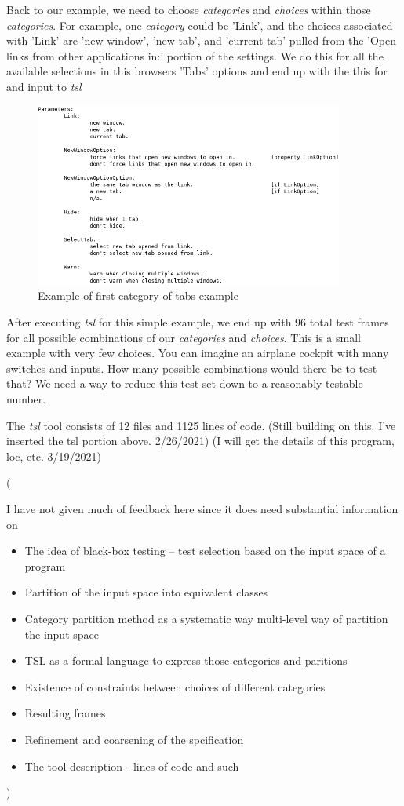 \documentclass[a4full,12pt]{article}
\newcommand{\eas}[1]{{\color{blue}\sf ({#1})}}
\newcommand{\ag}[1]{{\color{red}\sf ({#1})}}
\begin{document}
Back to our example, we need to choose \emph{categories} and \emph{choices} within those
  \emph{categories}. For example, one \emph{category} could be 'Link', and the choices
  associated with 'Link' are 'new window', 'new tab', and 'current tab' pulled from the
  'Open links from other applications in:' portion of the settings. We do this for all
  the available selections in this browsers 'Tabs' options and end up with the this for
  and input to \emph{tsl}
\begin{figure}[htb]
\centering
\includegraphics[width=4in,keepaspectratio]{images/tsl_input_final.png}
\caption{Example of first category of tabs example}
\label{fig:tsl_input_final}
\end{figure}

After executing \emph{tsl} for this simple example, we end up with 96 total test frames
  for all possible combinations of our \emph{categories} and \emph{choices}. This is a
  small example with very few choices. You can imagine an airplane cockpit with many
  switches and inputs. How many possible combinations would there be to test that? We
  need a way to reduce this test set down to a reasonably testable number.
  
  
The \emph{tsl} tool consists of 12 files and 1125 lines of code.
\ag{Still building on this. I've inserted the tsl portion above. 2/26/2021}
\ag{I will get the details of this program, loc, etc. 3/19/2021}
\eas{I have not given much of feedback here since it does need substantial information on
  \begin{itemize}
  \item The idea of black-box testing -- test selection based on the input space of a program
  \item Partition of the input space into equivalent classes
  \item Category partition method as a systematic way multi-level way of partition the input space
  \item TSL as a formal language to express those categories and paritions
  \item Existence of constraints between choices of different categories
  \item Resulting frames
  \item Refinement and coarsening of the spcification
  \item The tool description - lines of code and such
  \end{itemize}
}
\end{document}

